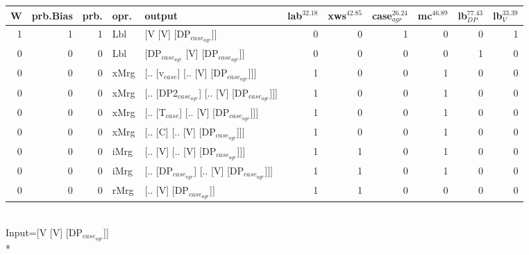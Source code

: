\begin{tabularx}{\linewidth}{rrrlXrrrrrr}
\hline
   W &   prb.Bias &   prb. & opr.   & output                                     &   lab$^{32.18}$ &   xws$^{42.85}$ &   case$_{agr}^{26.24}$ &   mc$^{46.89}$ &   lb$_{DP}^{77.43}$ &   lb$_{V}^{33.39}$ \\
\hline
   1 &       1 &   1 & Lbl  & [V [V] [DP$_{case_{agr}}$]]                      &             0 &             0 &                  1 &            0 &               0 &              1 \\
   0 &       0 &   0 & Lbl  & [DP$_{case_{agr}}$ [V] [DP$_{case_{agr}}$]]            &             0 &             0 &                  0 &            0 &               1 &              0 \\
   0 &       0 &   0 & xMrg & [.. [v$_{case}$] [.. [V] [DP$_{case_{agr}}$]]]       &             1 &             0 &                  0 &            1 &               0 &              0 \\
   0 &       0 &   0 & xMrg & [.. [DP2$_{case_{agr}}$] [.. [V] [DP$_{case_{agr}}$]]] &             1 &             0 &                  0 &            1 &               0 &              0 \\
   0 &       0 &   0 & xMrg & [.. [T$_{case}$] [.. [V] [DP$_{case_{agr}}$]]]       &             1 &             0 &                  0 &            1 &               0 &              0 \\
   0 &       0 &   0 & xMrg & [.. [C] [.. [V] [DP$_{case_{agr}}$]]]            &             1 &             0 &                  0 &            1 &               0 &              0 \\
   0 &       0 &   0 & iMrg & [.. [V] [.. [V] [DP$_{case_{agr}}$]]]            &             1 &             1 &                  0 &            1 &               0 &              0 \\
   0 &       0 &   0 & iMrg & [.. [DP$_{case_{agr}}$] [.. [V] [DP$_{case_{agr}}$]]]  &             1 &             1 &                  0 &            1 &               0 &              0 \\
   0 &       0 &   0 & rMrg & [.. [V] [DP$_{case_{agr}}$]]                     &             1 &             1 &                  0 &            0 &               0 &              0 \\
\hline
\end{tabularx}\endgroup\\
\begingroup\scriptsize Input=[V [V] [DP$_{case_{agr}}$]]\\*
